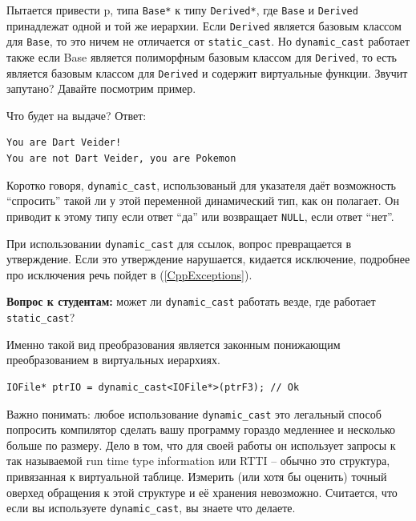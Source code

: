 \documentclass[a4paper,12pt,oneside]{article}
\newif\ifanswers
\begin{document}
Пытается привести p, типа \lstinline!Base*! к типу \lstinline!Derived*!, где \lstinline!Base! и \lstinline!Derived! принадлежат одной и той же иерархии. Если \lstinline!Derived! является базовым классом для \lstinline!Base!, то это ничем не отличается от \lstinline!static_cast!. Но \lstinline!dynamic_cast! работает также если Base является полиморфным базовым классом для \lstinline!Derived!, то есть является базовым классом для \lstinline!Derived! и содержит виртуальные функции. Звучит запутано? Давайте посмотрим пример.



Что будет на выдаче? Ответ:

\begin{verbatim}
You are Dart Veider!
You are not Dart Veider, you are Pokemon
\end{verbatim}

Коротко говоря, \lstinline!dynamic_cast!, использованый для указателя даёт возможность ``спросить'' такой ли у этой переменной динамический тип, как он полагает. Он приводит к этому типу если ответ ``да'' или возвращает \lstinline!NULL!, если ответ ``нет''.

При использовании \lstinline!dynamic_cast! для ссылок, вопрос превращается в утверждение. Если это утверждение нарушается, кидается исключение, подробнее про исключения речь пойдет в (\ref{CppExceptions}).

\textbf{Вопрос к студентам:} может ли \lstinline!dynamic_cast! работать везде, где работает \lstinline!static_cast!?

\ifanswers
Правильный ответ: нет \lstinline!dynamic_cast! очень важно, чтобы в базовом классе была хотя бы одна виртуальная функция -- если таблицы виртуальных методов не будет существовать, динамическое приведение не будет работать.
\fi

Именно такой вид преобразования является законным понижающим преобразованием в виртуальных иерархиях.

\begin{lstlisting}
IOFile* ptrIO = dynamic_cast<IOFile*>(ptrF3); // Ok
\end{lstlisting}

Важно понимать: любое использование \lstinline!dynamic_cast! это легальный способ попросить компилятор сделать вашу программу гораздо медленнее и несколько больше по размеру. Дело в том, что для своей работы он использует запросы к так называемой run time type information или RTTI -- обычно это структура, привязанная к виртуальной таблице. Измерить (или хотя бы оценить) точный оверхед обращения к этой структуре и её хранения невозможно. Считается, что если вы используете \lstinline!dynamic_cast!, вы знаете что делаете.
\end{document}
